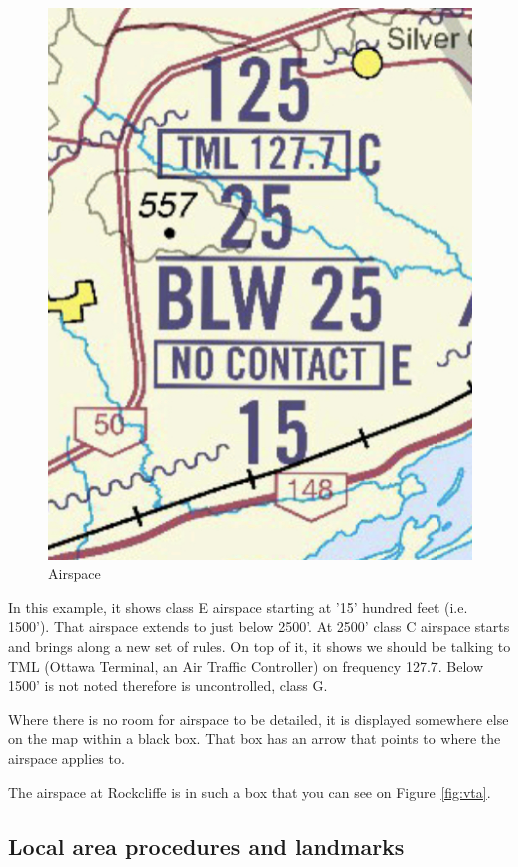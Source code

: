 \documentclass[12pt,letterpaper]{article}
\begin{document}
        \begin{figure}[h]
          \begin{center}
            \includegraphics[scale=0.25]{airspace.jpeg}
          \end{center}
          \caption{Airspace}
          \label{fig:airspace}
        \end{figure}

        In this example, it shows class E airspace starting at '15' hundred feet (i.e. 1500'). That airspace extends to just below 2500'. At 2500' class C airspace starts and brings along a new set of rules. On top of it, it shows we should be talking to TML (Ottawa Terminal, an Air Traffic Controller) on frequency 127.7. Below 1500' is not noted therefore is uncontrolled, class G.
        
        Where there is no room for airspace to be detailed, it is displayed somewhere else on the map within a black box. That box has an arrow that points to where the airspace applies to.
        
        The airspace at Rockcliffe is in such a box that you can see on Figure \ref{fig:vta}.
        
        \subsection{Local area procedures and landmarks}
        \label{subsection:localprocs}
        
\end{document}
